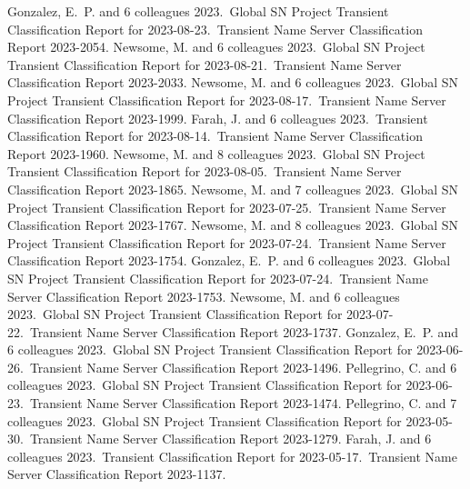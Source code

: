 \documentclass[margin,line]{res}
\begin{document}
\begin{resume}
 Gonzalez, E.~P. and 6 colleagues 2023.\ Global SN Project Transient Classification Report for 2023-08-23.\ Transient Name Server Classification Report 2023-2054.
 Newsome, M. and 6 colleagues 2023.\ Global SN Project Transient Classification Report for 2023-08-21.\ Transient Name Server Classification Report 2023-2033.
 Newsome, M. and 6 colleagues 2023.\ Global SN Project Transient Classification Report for 2023-08-17.\ Transient Name Server Classification Report 2023-1999.
 Farah, J. and 6 colleagues 2023.\ Transient Classification Report for 2023-08-14.\ Transient Name Server Classification Report 2023-1960.
 Newsome, M. and 8 colleagues 2023.\ Global SN Project Transient Classification Report for 2023-08-05.\ Transient Name Server Classification Report 2023-1865.
 Newsome, M. and 7 colleagues 2023.\ Global SN Project Transient Classification Report for 2023-07-25.\ Transient Name Server Classification Report 2023-1767.
 Newsome, M. and 8 colleagues 2023.\ Global SN Project Transient Classification Report for 2023-07-24.\ Transient Name Server Classification Report 2023-1754.
 Gonzalez, E.~P. and 6 colleagues 2023.\ Global SN Project Transient Classification Report for 2023-07-24.\ Transient Name Server Classification Report 2023-1753.
 Newsome, M. and 6 colleagues 2023.\ Global SN Project Transient Classification Report for 2023-07-22.\ Transient Name Server Classification Report 2023-1737.
 Gonzalez, E.~P. and 6 colleagues 2023.\ Global SN Project Transient Classification Report for 2023-06-26.\ Transient Name Server Classification Report 2023-1496.
 Pellegrino, C. and 6 colleagues 2023.\ Global SN Project Transient Classification Report for 2023-06-23.\ Transient Name Server Classification Report 2023-1474.
 Pellegrino, C. and 7 colleagues 2023.\ Global SN Project Transient Classification Report for 2023-05-30.\ Transient Name Server Classification Report 2023-1279.
 Farah, J. and 6 colleagues 2023.\ Transient Classification Report for 2023-05-17.\ Transient Name Server Classification Report 2023-1137.

\end{resume}
\end{document}
